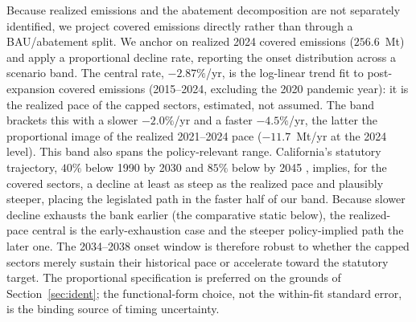 \documentclass[11pt,letterpaper]{article}
\theoremstyle{plain}
\theoremstyle{definition}
\numberwithin{equation}{section}
\begin{document}
Because realized emissions and the abatement decomposition are not separately identified, we project covered emissions directly rather than through a BAU/abatement split. We anchor on realized 2024 covered emissions ($256.6$~Mt) and apply a proportional decline rate, reporting the onset distribution across a scenario band. The central rate, $-2.87\%$/yr, is the log-linear trend fit to post-expansion covered emissions (2015--2024, excluding the 2020 pandemic year): it is the realized pace of the capped sectors, estimated, not assumed. The band brackets this with a slower $-2.0\%$/yr and a faster $-4.5\%$/yr, the latter the proportional image of the realized 2021--2024 pace ($-11.7$~Mt/yr at the 2024 level). This band also spans the policy-relevant range. California's statutory trajectory, $40\%$ below 1990 by 2030 and $85\%$ below by 2045 \citep{sb32, ab1279}, implies, for the covered sectors, a
decline at least as steep as the realized pace and plausibly steeper, placing the legislated path in the faster half of our band. Because slower decline exhausts the bank earlier (the comparative static below), the realized-pace central is the early-exhaustion case and the steeper policy-implied path the later one. The 2034--2038 onset window is therefore robust to whether the capped sectors merely sustain their historical pace or accelerate toward the statutory target. The proportional specification is preferred on the grounds of Section~\ref{sec:ident}; the functional-form choice, not the within-fit standard error, is the binding source of timing uncertainty.
\end{document}
